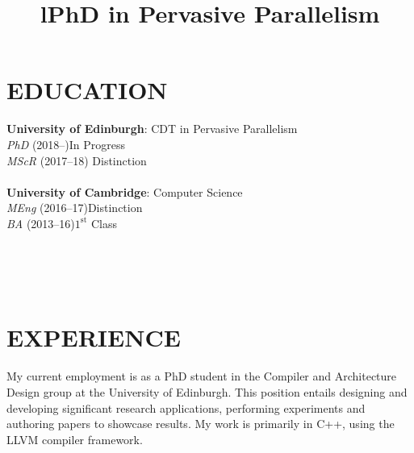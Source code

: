 \documentclass[margin]{res}
\begin{document}
\begin{resume}

\section{EDUCATION}
\textbf{University of Edinburgh}: CDT in Pervasive Parallelism \\
{\sl PhD} (2018--)\hfill In Progress
\\
{\sl MScR} (2017--18)\hfill
Distinction \\\\
\textbf{University of Cambridge}: Computer Science \\
{\sl MEng} (2016--17)\hfill Distinction \\
{\sl BA} (2013--16)\hfill $1^{\mathrm{st}}$ Class


\begin{format}
\title{l}\\
\\
\body\\
\end{format}

\section{EXPERIENCE}

\title{\textbf{PhD in Pervasive Parallelism}}
\begin{position}
My current employment is as a PhD student in the Compiler and Architecture
Design group at the University of Edinburgh. This position entails designing and
developing significant research applications, performing experiments and
authoring papers to showcase results. My work is primarily in C++, using the
LLVM compiler framework.
\end{position}


\end{resume}
\end{document}

